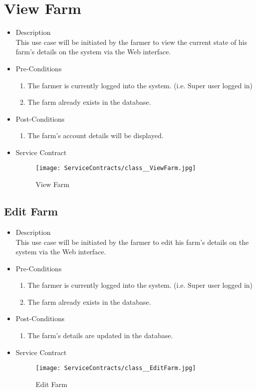 \documentclass[11pt,fleqn]{book} %
\begin{document}
\section{View Farm}
\begin{itemize}
	\item Description\\
	This use case will be initiated by the farmer to view the current state of his farm’s details on the system via the Web interface.
	\item Pre-Conditions
	\begin{enumerate}
		\item The farmer is currently logged into the system. (i.e. Super user logged in)
		\item The farm already exists in the database.					
	\end{enumerate}
	\item Post-Conditions
	\begin{enumerate}
		\item The farm’s account details will be displayed.
	\end{enumerate}
	\item Service Contract
	\begin{figure}
		\texttt{[image: ServiceContracts/class\_\_ViewFarm.jpg]}
		\caption{View Farm}
	\end{figure}
\end{itemize}

\subsection{Edit Farm}
\begin{itemize}
	\item Description\\
	This use case will be initiated by the farmer to edit his farm’s details on the system via the Web interface.
	\item Pre-Conditions
	\begin{enumerate}
		\item The farmer is currently logged into the system. (i.e. Super user logged in)
		\item The farm already exists in the database.					
	\end{enumerate}
	\item Post-Conditions
	\begin{enumerate}
		\item The farm’s details are updated in the database.
	\end{enumerate}
	\item Service Contract
	\begin{figure}
		\texttt{[image: ServiceContracts/class\_\_EditFarm.jpg]}
		\caption{Edit Farm}
	\end{figure}
\end{itemize}
\end{document}
